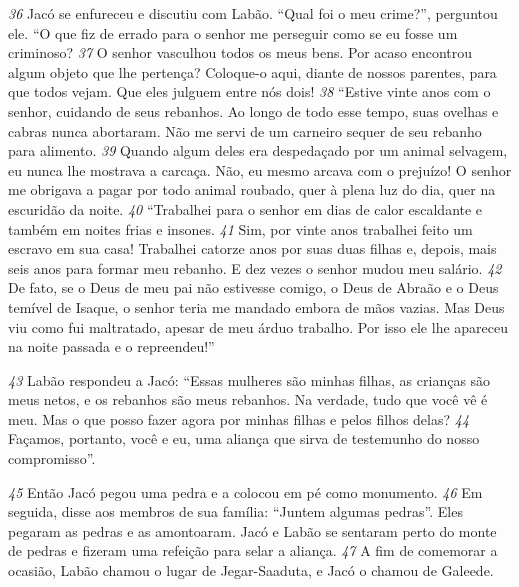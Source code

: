 \bigskip   
\textit{\tiny 36}
Jacó se enfureceu e discutiu com Labão. “Qual foi o meu crime?”, perguntou
ele. “O que fiz de errado para o senhor me perseguir como se eu fosse um
criminoso? 
\textit{\tiny 37}
O senhor vasculhou todos os meus bens. Por acaso encontrou algum
objeto que lhe pertença? Coloque-o aqui, diante de nossos parentes, para que
todos vejam. Que eles julguem entre nós dois!
\textit{\tiny 38}
“Estive vinte anos com o senhor, cuidando de seus rebanhos. Ao longo de
todo esse tempo, suas ovelhas e cabras nunca abortaram. Não me servi de um
carneiro sequer de seu rebanho para alimento. 
\textit{\tiny 39}
Quando algum deles era
despedaçado por um animal selvagem, eu nunca lhe mostrava a carcaça. Não, eu
mesmo arcava com o prejuízo! O senhor me obrigava a pagar por todo animal
roubado, quer à plena luz do dia, quer na escuridão da noite.
\textit{\tiny 40}
“Trabalhei para o senhor em dias de calor escaldante e também em noites
frias e insones. 
\textit{\tiny 41}
Sim, por vinte anos trabalhei feito um escravo em sua casa!
Trabalhei catorze anos por suas duas filhas e, depois, mais seis anos para formar
meu rebanho. E dez vezes o senhor mudou meu salário. 
\textit{\tiny 42}
De fato, se o Deus de
meu pai não estivesse comigo, o Deus de Abraão e o Deus temível de Isaque,
o
senhor teria me mandado embora de mãos vazias. Mas Deus viu como fui
maltratado, apesar de meu árduo trabalho. Por isso ele lhe apareceu na noite
passada e o repreendeu!”

\bigskip   
\textit{\tiny 43}
Labão respondeu a Jacó: “Essas mulheres são minhas filhas, as crianças são
meus netos, e os rebanhos são meus rebanhos. Na verdade, tudo que você vê é
meu. Mas o que posso fazer agora por minhas filhas e pelos filhos delas?
\textit{\tiny 44}
Façamos, portanto, você e eu, uma aliança que sirva de testemunho do nosso
compromisso”.

\bigskip   
\textit{\tiny 45}
Então Jacó pegou uma pedra e a colocou em pé como monumento. 
\textit{\tiny 46}
Em
seguida, disse aos membros de sua família: “Juntem algumas pedras”. Eles
pegaram as pedras e as amontoaram. Jacó e Labão se sentaram perto do monte de
pedras e fizeram uma refeição para selar a aliança. 
\textit{\tiny 47}
A fim de comemorar a
ocasião, Labão chamou o lugar de Jegar-Saaduta, e Jacó o chamou de Galeede.

